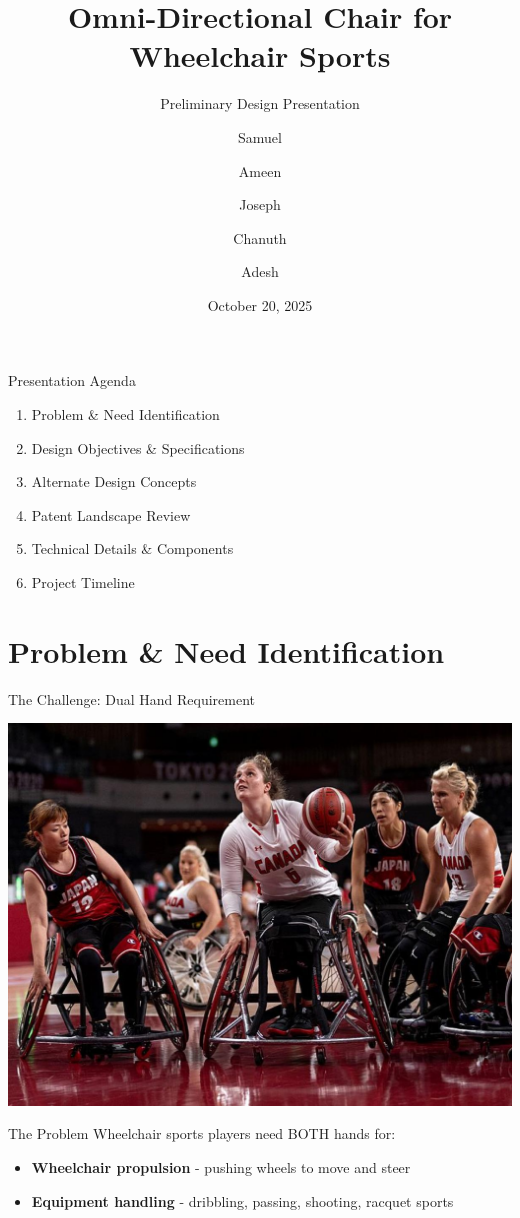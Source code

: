 \documentclass[aspectratio=169]{beamer}
\title{Omni-Directional Chair for Wheelchair Sports}
\subtitle{Preliminary Design Presentation}
\author{Samuel \and Ameen \and Joseph \and Chanuth \and Adesh}
\institute{MTE 481 - Mechatronics Engineering Design Project\\Capstone Group 52}
\date{October 20, 2025}
\begin{document}
\begin{frame}
\titlepage
\end{frame}

\begin{frame}{Presentation Agenda}
\Large
\begin{enumerate}
    \item Problem \& Need Identification
    \item Design Objectives \& Specifications
    \item Alternate Design Concepts
    \item Patent Landscape Review
    \item Technical Details \& Components
    \item Project Timeline
\end{enumerate}
\end{frame}

\section{Problem \& Need Identification}

\begin{frame}{The Challenge: Dual Hand Requirement}
\begin{center}
\includegraphics[height=0.5\textheight]{pdpAssets/WheelchairBasketballPlayerPhoto.jpg}
\end{center}

\begin{block}{The Problem}
Wheelchair sports players need BOTH hands for:
\begin{itemize}
    \item \textbf{Wheelchair propulsion} - pushing wheels to move and steer
    \item \textbf{Equipment handling} - dribbling, passing, shooting, racquet sports
\end{itemize}
\end{block}
\end{frame}
\end{document}
